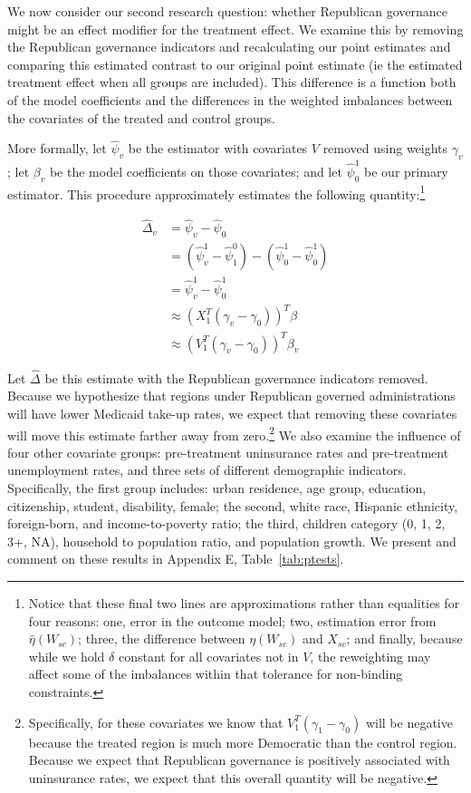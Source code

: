 \documentclass[12pt]{article}
\begin{document}
We now consider our second research question: whether Republican governance might be an effect modifier for the treatment effect. We examine this by removing the Republican governance indicators and recalculating our point estimates and comparing this estimated contrast to our original point estimate (ie the estimated treatment effect when all groups are included). This difference is a function both of the model coefficients and the differences in the weighted imbalances between the covariates of the treated and control groups.

More formally, let $\hat{\psi}_v$ be the estimator with covariates $V$ removed using weights $\gamma_v$; let $\beta_v$ be the model coefficients on those covariates; and let $\hat{\psi}^1_0$ be our primary estimator. This procedure approximately estimates the following quantity:\footnote{Notice that these final two lines are approximations rather than equalities for four reasons: one, error in the outcome model; two, estimation error from $\hat{\eta}(W_{sc})$; three, the difference between $\eta(W_{sc})$ and $X_{sc}$; and finally, because while we hold $\delta$ constant for all covariates not in $V$, the reweighting may affect some of the imbalances within that tolerance for non-binding constraints.}

\begin{align*}
    \hat{\Delta}_v &= \hat{\psi}_v - \hat{\psi}_0 \\
    &= (\hat{\psi}^1_v - \hat{\psi}^0_1)  - (\hat{\psi}^1_0 - \hat{\psi}^1_0) \\
    &= \hat{\psi}^1_v - \hat{\psi}^1_0 \\
    &\approx (X_1^T(\gamma_v - \gamma_0))^T\beta \\
    &\approx (V_1^T(\gamma_v - \gamma_0))^T\beta_v
\end{align*}

Let $\hat{\Delta}$ be this estimate with the Republican governance indicators removed. Because we hypothesize that regions under Republican governed administrations will have lower Medicaid take-up rates, we expect that removing these covariates will move this estimate farther away from zero.\footnote{Specifically, for these covariates we know that $V_1^T(\gamma_1 - \gamma_0)$ will be negative because the treated region is much more Democratic than the control region. Because we expect that Republican governance is positively associated with uninsurance rates, we expect that this overall quantity will be negative.} We also examine the influence of four other covariate groups: pre-treatment uninsurance rates and pre-treatment unemployment rates, and three sets of different demographic indicators. Specifically, the first group includes: urban residence, age group, education, citizenship, student, disability, female; the second, white race, Hispanic ethnicity, foreign-born, and income-to-poverty ratio; the third, children category (0, 1, 2, 3+, NA), household to population ratio, and population growth. We present and comment on these results in Appendix E, Table~\ref{tab:ptests}.
\end{document}
